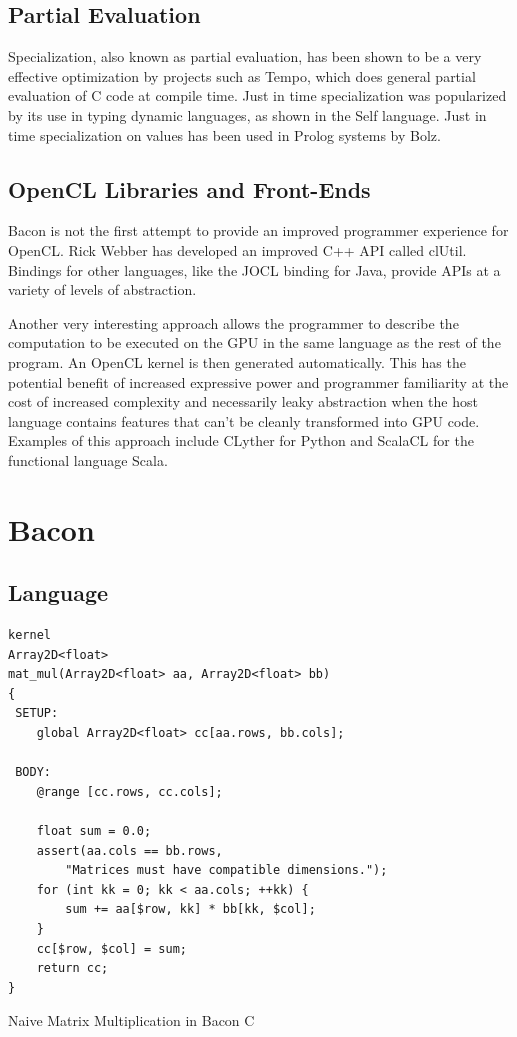 \documentclass{llncs}
\begin{document}
\subsection{Partial Evaluation}

Specialization, also known as partial evaluation, has been shown to be
a very effective optimization by projects such as
Tempo\cite{consel:1998}, which does general partial evaluation of C
code at compile time. Just in time specialization was popularized by
its use in typing dynamic languages, as shown in the Self
language\cite{chambers:1992}. Just in time specialization on values has
been used in Prolog systems by Bolz\cite{bolz:2010}.

\subsection{OpenCL Libraries and Front-Ends}

Bacon is not the first attempt to provide an improved programmer
experience for OpenCL. Rick Webber has developed an improved C++ API
called clUtil\cite{webber:2011}. Bindings for other languages, like
the JOCL\cite{hutter:2011} binding for Java, provide APIs at a variety
of levels of abstraction.

Another very interesting approach allows the programmer to describe
the computation to be executed on the GPU in the same language as the
rest of the program. An OpenCL kernel is then generated
automatically. This has the potential benefit of increased expressive
power and programmer familiarity at the cost of increased complexity
and necessarily leaky abstraction when the host language contains
features that can't be cleanly transformed into GPU code. Examples of
this approach include CLyther\cite{rossross:2011} for Python and
ScalaCL\cite{chafik:2011} for the functional language Scala.

\section{Bacon}
\subsection{Language}

\begin{listing}[tb]
\begin{verbatim}
kernel
Array2D<float>
mat_mul(Array2D<float> aa, Array2D<float> bb) 
{
 SETUP:
    global Array2D<float> cc[aa.rows, bb.cols];

 BODY:
    @range [cc.rows, cc.cols];

    float sum = 0.0;
    assert(aa.cols == bb.rows, 
        "Matrices must have compatible dimensions.");
    for (int kk = 0; kk < aa.cols; ++kk) {
        sum += aa[$row, kk] * bb[kk, $col];
    }
    cc[$row, $col] = sum;
    return cc;
}
\end{verbatim}
\caption{Naive Matrix Multiplication in Bacon C}\label{mmk}
\end{listing}
\end{document}
